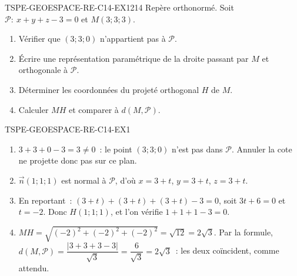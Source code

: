 
\begin{exercice}{TSPE-GEOESPACE-RE-C14-EX1}{2}{14}
Repère orthonormé. Soit $\mathcal{P}:\ x+y+z-3=0$ et $M(3;3;3)$.
\begin{enumerate}
  \item Vérifier que $(3;3;0)$ n'appartient pas à $\mathcal{P}$.
  \item Écrire une représentation paramétrique de la droite passant par $M$
        et orthogonale à $\mathcal{P}$.
  \item Déterminer les coordonnées du projeté orthogonal $H$ de $M$.
  \item Calculer $MH$ et comparer à $d(M,\mathcal{P})$.
\end{enumerate}
\end{exercice}


\begin{corrige}{TSPE-GEOESPACE-RE-C14-EX1}
\begin{enumerate}
  \item $3+3+0-3=3\neq0$~: le point $(3;3;0)$ n'est pas dans $\mathcal{P}$.
        Annuler la cote ne projette donc pas sur ce plan.
  \item $\vec{n}(1;1;1)$ est normal à $\mathcal{P}$, d'où
        $x=3+t$, $y=3+t$, $z=3+t$.
  \item En reportant~: $(3+t)+(3+t)+(3+t)-3=0$, soit $3t+6=0$ et $t=-2$.
        Donc $H(1;1;1)$, et l'on vérifie $1+1+1-3=0$.
  \item $MH=\sqrt{(-2)^2+(-2)^2+(-2)^2}=\sqrt{12}=2\sqrt{3}$. Par la formule,
        $d(M,\mathcal{P})=\dfrac{\lvert3+3+3-3\rvert}{\sqrt{3}}
        =\dfrac{6}{\sqrt{3}}=2\sqrt{3}$~: les deux coïncident, comme attendu.
\end{enumerate}
\end{corrige}
